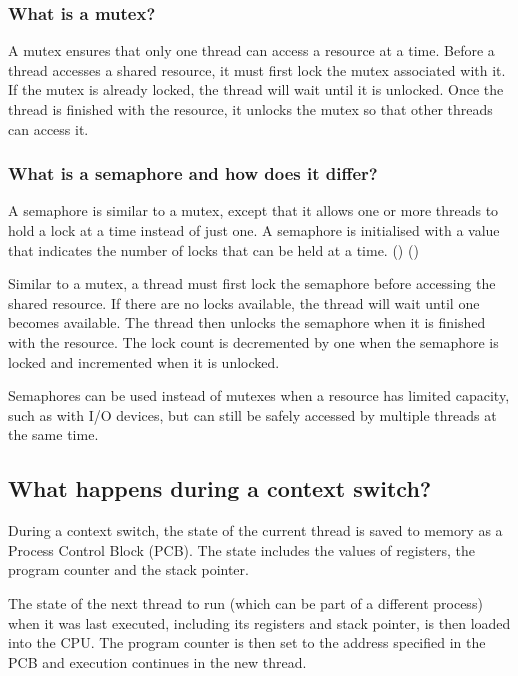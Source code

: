 \documentclass{article}
\begin{document}
    \subsubsection{What is a mutex?}
    A mutex ensures that only one thread can access a resource at a time.
    Before a thread accesses a shared resource, it must first lock the mutex associated with it.
    If the mutex is already locked, the thread will wait until it is unlocked.
    Once the thread is finished with the resource, it unlocks the mutex so that other
    threads can access it.

    \subsubsection{What is a semaphore and how does it differ?}
    A semaphore is similar to a mutex, except that it allows one or more threads to hold
    a lock at a time instead of just one. A semaphore is initialised with a value
    that indicates the number of locks that can be held at a time. (\cite{linux_manual_sem_init3_nodate}) (\cite{linux_manual_sem_wait3_nodate})

    Similar to a mutex, a thread must first lock the semaphore before accessing the shared resource.
    If there are no locks available, the thread will wait until one becomes available.
    The thread then unlocks the semaphore when it is finished with the resource.
    The lock count is decremented by one when the semaphore is locked and incremented
    when it is unlocked.

    Semaphores can be used instead of mutexes when a resource has limited capacity,
    such as with I/O devices, but can still be safely accessed by multiple threads at the same time.

\subsection{What happens during a context switch?}

During a context switch, the state of the current thread
is saved to memory as a Process Control Block (PCB). The state includes the values of registers, the program counter
and the stack pointer.

The state of the next thread to run (which can be part of a different process) when it was last executed,
including its registers and stack pointer,
is then loaded into the CPU. The program counter is then set to the address
specified in the PCB and execution continues in the new thread.
\end{document}
